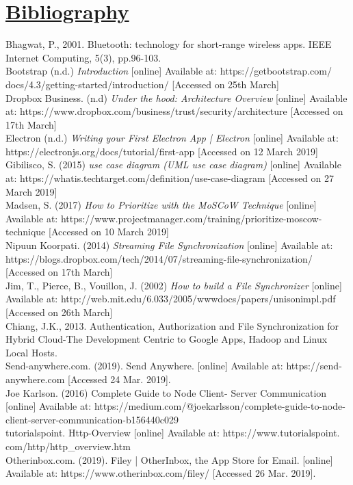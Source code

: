 \documentclass{article}
\begin{document}
\section{\underline{Bibliography}}

Bhagwat, P., 2001. Bluetooth: technology for short-range wireless apps. IEEE Internet Computing, 5(3), pp.96-103. \\

Bootstrap (n.d.) \textit{Introduction} [online] Available at: https://getbootstrap.com/
docs/4.3/getting-started/introduction/ [Accessed on 25th March] \\

Dropbox Business. (n.d) \textit{Under the hood: Architecture Overview} [online] Available at: https://www.dropbox.com/business/trust/security/architecture [Accessed on 17th March] \\

Electron (n.d.) \textit{Writing your First Electron App | Electron} [online] Available at: https://electronjs.org/docs/tutorial/first-app [Accessed on 12 March 2019] \\

Gibilisco, S. (2015) \textit{use case diagram (UML use case diagram)} [online] Available at: https://whatis.techtarget.com/definition/use-case-diagram [Accessed on 27 March 2019]\\

Madsen, S. (2017) \textit{How to Prioritize with the MoSCoW Technique} [online] Available at: https://www.projectmanager.com/training/prioritize-moscow-technique [Accessed on 10 March 2019] \\

Nipuun Koorpati. (2014) \textit{Streaming File Synchronization } [online] Available at: https://blogs.dropbox.com/tech/2014/07/streaming-file-synchronization/
[Accessed on 17th March] \\

Jim, T., Pierce, B., Vouillon, J.  (2002) \textit{How to build a File Synchronizer} [online] Available at: http://web.mit.edu/6.033/2005/wwwdocs/papers/unisonimpl.pdf [Accessed on 26th March] \\

Chiang, J.K., 2013. Authentication, Authorization and File Synchronization for Hybrid Cloud-The Development Centric to Google Apps, Hadoop and Linux Local Hosts. \\

Send-anywhere.com. (2019). Send Anywhere. [online] Available at: https://send-anywhere.com [Accessed 24 Mar. 2019]. \\

Joe Karlson. (2016) Complete Guide to Node Client- Server Communication [online] Available at: https://medium.com/@joekarlsson/complete-guide-to-node-client-server-communication-b156440c029 \\

tutorialspoint. Http-Overview [online] Available at: https://www.tutorialspoint.
com/http/http\_overview.htm \\

Otherinbox.com. (2019). Filey | OtherInbox, the App Store for Email. [online] Available at: https://www.otherinbox.com/filey/ [Accessed 26 Mar. 2019]. \\
\end{document}
